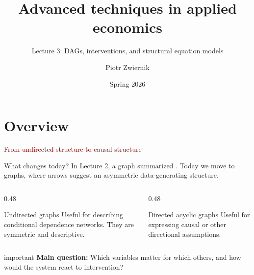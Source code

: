 \documentclass[dvipsnames,aspectratio=169,handout]{beamer}
\title{Advanced techniques in applied economics}
\subtitle{Lecture 3: DAGs, interventions, and structural equation models}
\author{Piotr Zwiernik}
\date{Spring 2026}
\begin{document}

\begin{frame}
\titlepage
\end{frame}


\section{Overview}

\begin{frame}{}
\begin{center}
{\huge \textcolor{DarkRed}{From undirected structure to causal structure}}
\end{center}
\end{frame}

\begin{frame}{What changes today?}
In Lecture 2, a graph summarized .
Today we move to  graphs, where arrows suggest an asymmetric data-generating structure.

\begin{columns}[T]
\begin{column}{0.48\textwidth}
\begin{block}{Undirected graphs}
Useful for describing conditional dependence networks.
They are symmetric and  descriptive.
\end{block}
\end{column}
\begin{column}{0.48\textwidth}
\begin{block}{Directed acyclic graphs}
Useful for expressing causal or other directional assumptions.
\end{block}
\end{column}
\end{columns}

\vspace{2mm}
\begin{beamercolorbox}[wd=\textwidth,sep=8pt,center,rounded=true,shadow=true]{important}
\textbf{Main question:}
Which variables matter for which others, and how would the system react to intervention?
\end{beamercolorbox}
\end{frame}
\end{document}
